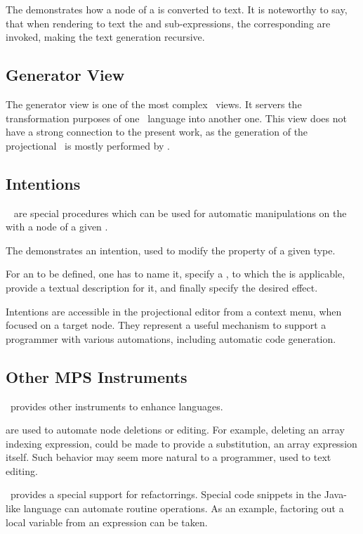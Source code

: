 
The  demonstrates how a node of a   is converted to text. It is noteworthy 
to say, that when rendering to text the  and  sub-expressions, the corresponding  are invoked,
making the text generation recursive.


\subsection{Generator View}
The generator view is one of the most complex \jbmps\ views. It servers the transformation purposes of one \jbmps\ language into another one.
This view does not have a strong connection to the present work, as the generation of the projectional \cpppl\ is mostly performed by .

\subsection{Intentions}
\jbmps\  are special procedures which can be used for automatic manipulations on the  with a node of a given .


The  demonstrates an intention, used to modify the  property of a given type. 

For an  to be defined, one has to name it, specify a , to which the  is applicable,
provide a textual description for it, and finally specify the desired effect.

Intentions are accessible in the projectional editor from a context menu, when focused on a target node. They represent 
a useful mechanism to support a programmer with various automations, including automatic code generation.

\subsection{Other MPS Instruments}

\jbmps\ provides other instruments to enhance languages. 

 are used to automate node deletions or editing. For example, deleting an array indexing expression, could be made
to provide a substitution, an array expression itself. Such behavior may seem more natural to a programmer, used to text editing.

\jbmps\ provides a special support for refactorrings. Special code snippets in the Java-like language can automate routine operations.
As an example, factoring out a local variable from an expression can be taken.